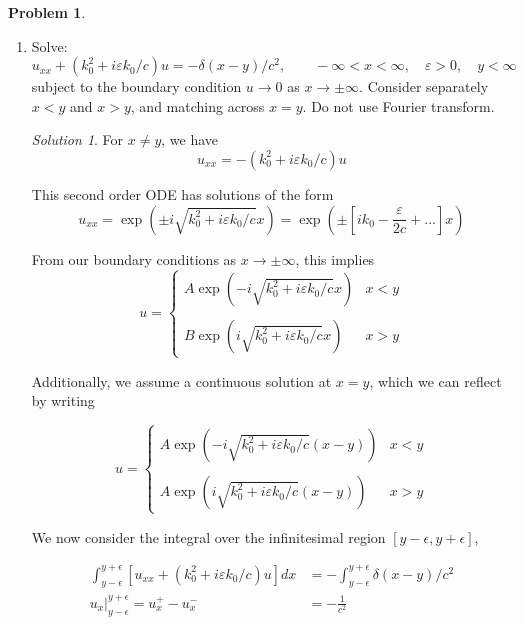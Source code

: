 \documentclass[12pt,a4paper]{article}
\theoremstyle{definition}
\newtheorem{problem}{Problem}
\theoremstyle{remark}
\newtheorem*{solution}{Solution}
\begin{document}
\begin{problem}
    \begin{enumerate}[label=(\alph*)]
        \item Solve: $$u_{xx} + (k_0^2 + i \varepsilon k_0/c) u = -\delta(x-y)/c^2, \qquad -\infty < x < \infty, \quad \varepsilon > 0, \quad y < \infty$$
        subject to the boundary condition $u \rightarrow 0 $ as $x \rightarrow \pm \infty$. Consider separately $x < y$ and $x > y$, and matching across $x=y$. Do not use Fourier transform. 
        \begin{solution}
            For $x \ne y$, we have $$u_{xx} = -(k_0^2 + i \varepsilon k_0/c) u$$

            This second order ODE has solutions of the form $$u_{xx} = \exp \left( \pm i \sqrt{k_0^2 + i \varepsilon k_0/c} x\right) = \exp \left( \pm \left[ i k_0 - \frac{\varepsilon}{2c} + \dots \right] x\right)$$

            From our boundary conditions as $x \rightarrow \pm \infty$, this implies $$u = \begin{cases}
                A \exp \left(-i \sqrt{k_0^2 + i \varepsilon k_0/c} x\right) & x < y \\\\
                B \exp \left( i \sqrt{k_0^2 + i \varepsilon k_0/c} x\right) & x > y
            \end{cases}$$

            Additionally, we assume a continuous solution at $x=y$, which we can reflect by writing 

            $$u = \begin{cases}
                A \exp \left(-i \sqrt{k_0^2 + i \varepsilon k_0/c} (x-y)\right) & x < y \\\\
                A \exp \left( i \sqrt{k_0^2 + i \varepsilon k_0/c} (x-y)\right) & x > y
            \end{cases}$$

            We now consider the integral over the infinitesimal region $[y-\epsilon, y+\epsilon]$,

            \begin{align*}
                \int_{y-\epsilon}^{y+\epsilon} \left[ u_{xx} + (k_0^2 + i \varepsilon k_0/c) u \right] dx &= - \int_{y-\epsilon}^{y+\epsilon} \delta(x-y)/c^2 \\
                u_x \Big|_{y-\epsilon}^{y+\epsilon} = u_x^+ - u_x^- &= - \frac{1}{c^2}
            \end{align*}


\end{solution}
\end{enumerate}
\end{problem}
\end{document}
